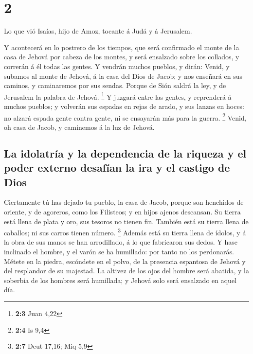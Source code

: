 \hypertarget{section-1}{%
\section{2}\label{section-1}}

 Lo que vió Isaías, hijo de Amoz, tocante á Judá y á
Jerusalem.

 Y acontecerá en lo postrero de los tiempos, que será
confirmado el monte de la casa de Jehová por cabeza de los montes, y
será ensalzado sobre los collados, y correrán á él todas las gentes.
 Y vendrán muchos pueblos, y dirán: Venid, y subamos al
monte de Jehová, á la casa del Dios de Jacob; y nos enseñará en sus
caminos, y caminaremos por sus sendas. Porque de Sión saldrá la ley, y
de Jerusalem la palabra de Jehová. \footnote{\textbf{2:3} Juan 4,22}
 Y juzgará entre las gentes, y reprenderá á muchos
pueblos; y volverán sus espadas en rejas de arado, y sus lanzas en
hoces: no alzará espada gente contra gente, ni se ensayarán más para la
guerra. \footnote{\textbf{2:4} Is 9,4}  Venid, oh casa de
Jacob, y caminemos á la luz de Jehová.

\hypertarget{la-idolatruxeda-y-la-dependencia-de-la-riqueza-y-el-poder-externo-desafuxedan-la-ira-y-el-castigo-de-dios}{%
\subsection{La idolatría y la dependencia de la riqueza y el poder
externo desafían la ira y el castigo de
Dios}\label{la-idolatruxeda-y-la-dependencia-de-la-riqueza-y-el-poder-externo-desafuxedan-la-ira-y-el-castigo-de-dios}}

 Ciertamente tú has dejado tu pueblo, la casa de Jacob,
porque son henchidos de oriente, y de agoreros, como los Filisteos; y en
hijos ajenos descansan.  Su tierra está llena de plata y
oro, sus tesoros no tienen fin. También está su tierra llena de
caballos; ni sus carros tienen número. \footnote{\textbf{2:7} Deut
  17,16; Miq 5,9}  Además está su tierra llena de ídolos,
y á la obra de sus manos se han arrodillado, á lo que fabricaron sus
dedos.  Y hase inclinado el hombre, y el varón se ha
humillado: por tanto no los perdonarás.  Métete en la
piedra, escóndete en el polvo, de la presencia espantosa de Jehová y del
resplandor de su majestad.  La altivez de los ojos del
hombre será abatida, y la soberbia de los hombres será humillada; y
Jehová solo será ensalzado en aquel día.

